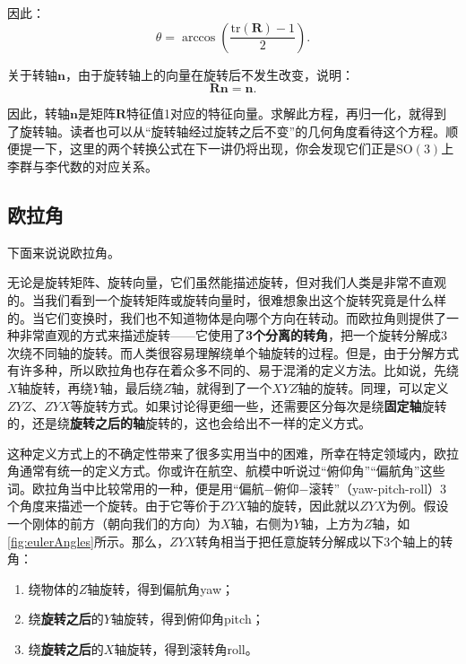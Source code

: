 因此：
\begin{equation}
\label{eq:R2theta}
\theta = \arccos ( \frac{\mathrm{tr}(\bm{R}) - 1}{2}  ) .
\end{equation}

关于转轴$\bm{n}$，由于旋转轴上的向量在旋转后不发生改变，说明：
\begin{equation}
\bm{R} \bm{n} = \bm{n}.	
\end{equation}

因此，转轴$\bm{n}$是矩阵$\bm{R}$特征值1对应的特征向量。求解此方程，再归一化，就得到了旋转轴。读者也可以从“旋转轴经过旋转之后不变”的几何角度看待这个方程。顺便提一下，这里的两个转换公式在下一讲仍将出现，你会发现它们正是$\mathrm{SO}(3)$上李群与李代数的对应关系。

\subsection{欧拉角}
下面来说说欧拉角。

无论是旋转矩阵、旋转向量，它们虽然能描述旋转，但对我们人类是非常不直观的。当我们看到一个旋转矩阵或旋转向量时，很难想象出这个旋转究竟是什么样的。当它们变换时，我们也不知道物体是向哪个方向在转动。而欧拉角则提供了一种非常直观的方式来描述旋转——它使用了\textbf{3个分离的转角}，把一个旋转分解成3次绕不同轴的旋转。而人类很容易理解绕单个轴旋转的过程。但是，由于分解方式有许多种，所以欧拉角也存在着众多不同的、易于混淆的定义方法。比如说，先绕$X$轴旋转，再绕$Y$轴，最后绕$Z$轴，就得到了一个$XYZ$轴的旋转。同理，可以定义$ZYZ$、$ZYX$等旋转方式。如果讨论得更细一些，还需要区分每次是绕\textbf{固定轴}旋转的，还是绕\textbf{旋转之后的轴}旋转的，这也会给出不一样的定义方式。

这种定义方式上的不确定性带来了很多实用当中的困难，所幸在特定领域内，欧拉角通常有统一的定义方式。你或许在航空、航模中听说过“俯仰角”“偏航角”这些词。欧拉角当中比较常用的一种，便是用“偏航−俯仰−滚转”（yaw-pitch-roll）3个角度来描述一个旋转。由于它等价于$ZYX$轴的旋转，因此就以$ZYX$为例。假设一个刚体的前方（朝向我们的方向）为$X$轴，右侧为$Y$轴，上方为$Z$轴，如\autoref{fig:eulerAngles}所示。那么，$ZYX$转角相当于把任意旋转分解成以下3个轴上的转角：

\begin{enumerate}
	\item 绕物体的$Z$轴旋转，得到偏航角yaw；
	\item 绕\textbf{旋转之后}的$Y$轴旋转，得到俯仰角pitch；
	\item 绕\textbf{旋转之后}的$X$轴旋转，得到滚转角roll。
\end{enumerate}

